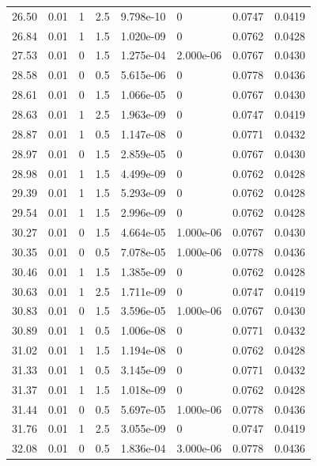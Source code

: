 \documentclass[preview]{standalone}
\begin{document}
{{{\begin{tabular}{L{1.2cm}C{1.2cm} C{0.3cm}C{0.5cm} C{1.4cm}C{1.4cm} C{1.4cm}C{1.4cm}}
  26.50  &  0.01  & 1     & 2.5 &  9.798e-10  & 0  & 0.0747 &  0.0419   \\ 
  26.84  &  0.01  & 1     & 1.5 &  1.020e-09  & 0  & 0.0762 &  0.0428   \\ 
  27.53  &  0.01  & 0     & 1.5 &  1.275e-04  & 2.000e-06  & 0.0767 &  0.0430   \\ 
  28.58  &  0.01  & 0     & 0.5 &  5.615e-06  & 0  & 0.0778 &  0.0436   \\ 
  28.61  &  0.01  & 0     & 1.5 &  1.066e-05  & 0  & 0.0767 &  0.0430   \\ 
  28.63  &  0.01  & 1     & 2.5 &  1.963e-09  & 0  & 0.0747 &  0.0419   \\ 
  28.87  &  0.01  & 1     & 0.5 &  1.147e-08  & 0  & 0.0771 &  0.0432   \\ 
  28.97  &  0.01  & 0     & 1.5 &  2.859e-05  & 0  & 0.0767 &  0.0430   \\ 
  28.98  &  0.01  & 1     & 1.5 &  4.499e-09  & 0  & 0.0762 &  0.0428   \\ 
  29.39  &  0.01  & 1     & 1.5 &  5.293e-09  & 0  & 0.0762 &  0.0428   \\ 
  29.54  &  0.01  & 1     & 1.5 &  2.996e-09  & 0  & 0.0762 &  0.0428   \\ 
  30.27  &  0.01  & 0     & 1.5 &  4.664e-05  & 1.000e-06  & 0.0767 &  0.0430   \\ 
  30.35  &  0.01  & 0     & 0.5 &  7.078e-05  & 1.000e-06  & 0.0778 &  0.0436   \\ 
  30.46  &  0.01  & 1     & 1.5 &  1.385e-09  & 0  & 0.0762 &  0.0428   \\ 
  30.63  &  0.01  & 1     & 2.5 &  1.711e-09  & 0  & 0.0747 &  0.0419   \\ 
  30.83  &  0.01  & 0     & 1.5 &  3.596e-05  & 1.000e-06  & 0.0767 &  0.0430   \\ 
  30.89  &  0.01  & 1     & 0.5 &  1.006e-08  & 0  & 0.0771 &  0.0432   \\ 
  31.02  &  0.01  & 1     & 1.5 &  1.194e-08  & 0  & 0.0762 &  0.0428   \\ 
  31.33  &  0.01  & 1     & 0.5 &  3.145e-09  & 0  & 0.0771 &  0.0432   \\ 
  31.37  &  0.01  & 1     & 1.5 &  1.018e-09  & 0  & 0.0762 &  0.0428   \\ 
  31.44  &  0.01  & 0     & 0.5 &  5.697e-05  & 1.000e-06  & 0.0778 &  0.0436   \\ 
  31.76  &  0.01  & 1     & 2.5 &  3.055e-09  & 0  & 0.0747 &  0.0419   \\ 
  32.08  &  0.01  & 0     & 0.5 &  1.836e-04  & 3.000e-06  & 0.0778 &  0.0436   \\ 

\end{tabular}}}}
\end{document}
